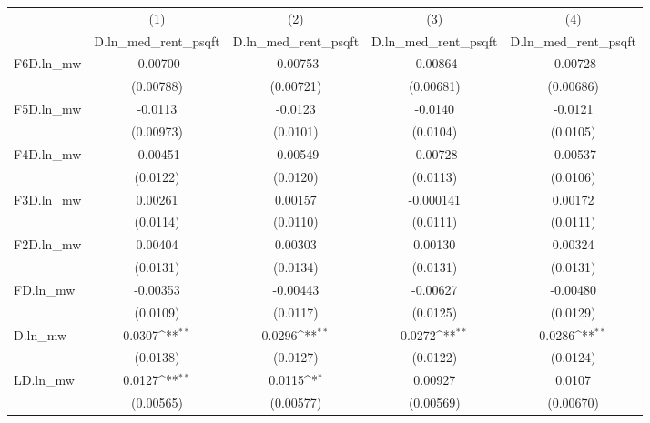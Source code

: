 {
\def\sym#1{\ifmmode^{#1}\else\(^{#1}\)\fi}
\begin{tabular}{l*{4}{c}}
\hline\hline
          &\multicolumn{1}{c}{(1)}&\multicolumn{1}{c}{(2)}&\multicolumn{1}{c}{(3)}&\multicolumn{1}{c}{(4)}\\
          &\multicolumn{1}{c}{D.ln\_med\_rent\_psqft}&\multicolumn{1}{c}{D.ln\_med\_rent\_psqft}&\multicolumn{1}{c}{D.ln\_med\_rent\_psqft}&\multicolumn{1}{c}{D.ln\_med\_rent\_psqft}\\
\hline
F6D.ln\_mw & -0.00700         & -0.00753         & -0.00864         & -0.00728         \\
          &(0.00788)         &(0.00721)         &(0.00681)         &(0.00686)         \\
[1em]
F5D.ln\_mw &  -0.0113         &  -0.0123         &  -0.0140         &  -0.0121         \\
          &(0.00973)         & (0.0101)         & (0.0104)         & (0.0105)         \\
[1em]
F4D.ln\_mw & -0.00451         & -0.00549         & -0.00728         & -0.00537         \\
          & (0.0122)         & (0.0120)         & (0.0113)         & (0.0106)         \\
[1em]
F3D.ln\_mw &  0.00261         &  0.00157         &-0.000141         &  0.00172         \\
          & (0.0114)         & (0.0110)         & (0.0111)         & (0.0111)         \\
[1em]
F2D.ln\_mw &  0.00404         &  0.00303         &  0.00130         &  0.00324         \\
          & (0.0131)         & (0.0134)         & (0.0131)         & (0.0131)         \\
[1em]
FD.ln\_mw  & -0.00353         & -0.00443         & -0.00627         & -0.00480         \\
          & (0.0109)         & (0.0117)         & (0.0125)         & (0.0129)         \\
[1em]
D.ln\_mw   &   0.0307\sym{**} &   0.0296\sym{**} &   0.0272\sym{**} &   0.0286\sym{**} \\
          & (0.0138)         & (0.0127)         & (0.0122)         & (0.0124)         \\
[1em]
LD.ln\_mw  &   0.0127\sym{**} &   0.0115\sym{*}  &  0.00927         &   0.0107         \\
          &(0.00565)         &(0.00577)         &(0.00569)         &(0.00670)         \\

\end{tabular}}
